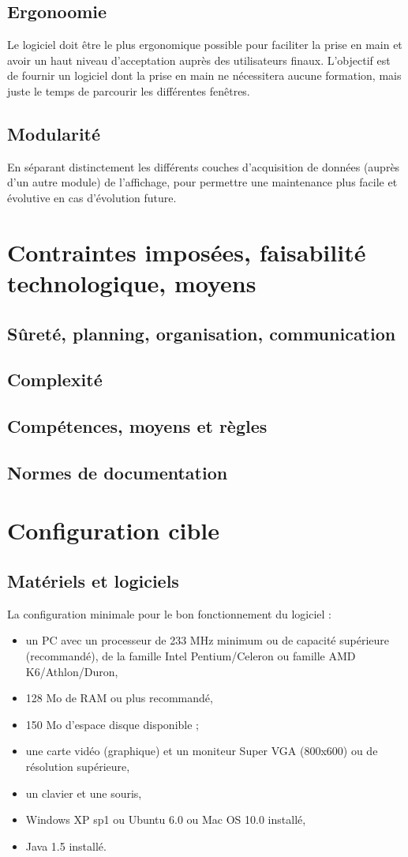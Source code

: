 \subsection{Ergonoomie}
Le logiciel doit être le plus ergonomique possible pour faciliter la prise en main et avoir un haut niveau d'acceptation auprès des utilisateurs finaux. L'objectif est de fournir un logiciel dont la prise en main ne nécessitera aucune formation, mais juste le temps de parcourir les différentes fenêtres.

\subsection{Modularité}
En séparant distinctement les différents couches d'acquisition de données (auprès d'un autre module) de l'affichage, pour permettre une maintenance plus facile et évolutive en cas d'évolution future.

\section{Contraintes imposées, faisabilité technologique, moyens}
\subsection{Sûreté, planning, organisation, communication}
\subsection{Complexité}
\subsection{Compétences, moyens et règles}
\subsection{Normes de documentation}

\section{Configuration cible}
\subsection{Matériels et logiciels}
La configuration minimale pour le bon fonctionnement du logiciel : 
\begin{itemize}
	\item un PC avec un processeur de 233 MHz minimum ou de capacité supérieure (recommandé), de la famille Intel Pentium/Celeron ou famille AMD K6/Athlon/Duron,
	\item 128 Mo de RAM ou plus recommandé,
	\item 150 Mo d'espace disque disponible ;
	\item une carte vidéo (graphique) et un moniteur Super VGA (800x600) ou de résolution supérieure,
	\item un clavier et une souris,
	\item Windows XP sp1 ou Ubuntu 6.0 ou Mac OS 10.0 installé,
	\item Java 1.5 installé.
\end{itemize}

